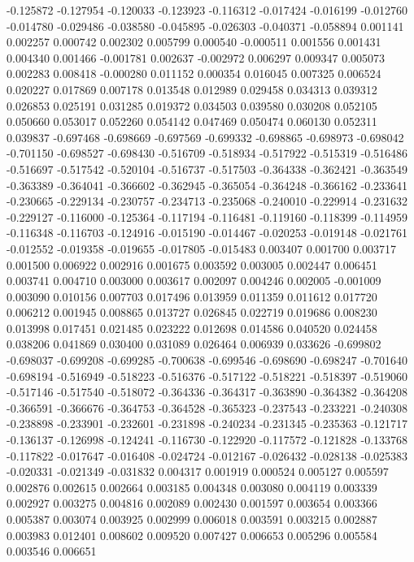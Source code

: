 -0.125872
-0.127954
-0.120033
-0.123923
-0.116312
-0.017424
-0.016199
-0.012760
-0.014780
-0.029486
-0.038580
-0.045895
-0.026303
-0.040371
-0.058894
0.001141
0.002257
0.000742
0.002302
0.005799
0.000540
-0.000511
0.001556
0.001431
0.004340
0.001466
-0.001781
0.002637
-0.002972
0.006297
0.009347
0.005073
0.002283
0.008418
-0.000280
0.011152
0.000354
0.016045
0.007325
0.006524
0.020227
0.017869
0.007178
0.013548
0.012989
0.029458
0.034313
0.039312
0.026853
0.025191
0.031285
0.019372
0.034503
0.039580
0.030208
0.052105
0.050660
0.053017
0.052260
0.054142
0.047469
0.050474
0.060130
0.052311
0.039837
-0.697468
-0.698669
-0.697569
-0.699332
-0.698865
-0.698973
-0.698042
-0.701150
-0.698527
-0.698430
-0.516709
-0.518934
-0.517922
-0.515319
-0.516486
-0.516697
-0.517542
-0.520104
-0.516737
-0.517503
-0.364338
-0.362421
-0.363549
-0.363389
-0.364041
-0.366602
-0.362945
-0.365054
-0.364248
-0.366162
-0.233641
-0.230665
-0.229134
-0.230757
-0.234713
-0.235068
-0.240010
-0.229914
-0.231632
-0.229127
-0.116000
-0.125364
-0.117194
-0.116481
-0.119160
-0.118399
-0.114959
-0.116348
-0.116703
-0.124916
-0.015190
-0.014467
-0.020253
-0.019148
-0.021761
-0.012552
-0.019358
-0.019655
-0.017805
-0.015483
0.003407
0.001700
0.003717
0.001500
0.006922
0.002916
0.001675
0.003592
0.003005
0.002447
0.006451
0.003741
0.004710
0.003000
0.003617
0.002097
0.004246
0.002005
-0.001009
0.003090
0.010156
0.007703
0.017496
0.013959
0.011359
0.011612
0.017720
0.006212
0.001945
0.008865
0.013727
0.026845
0.022719
0.019686
0.008230
0.013998
0.017451
0.021485
0.023222
0.012698
0.014586
0.040520
0.024458
0.038206
0.041869
0.030400
0.031089
0.026464
0.006939
0.033626
-0.699802
-0.698037
-0.699208
-0.699285
-0.700638
-0.699546
-0.698690
-0.698247
-0.701640
-0.698194
-0.516949
-0.518223
-0.516376
-0.517122
-0.518221
-0.518397
-0.519060
-0.517146
-0.517540
-0.518072
-0.364336
-0.364317
-0.363890
-0.364382
-0.364208
-0.366591
-0.366676
-0.364753
-0.364528
-0.365323
-0.237543
-0.233221
-0.240308
-0.238898
-0.233901
-0.232601
-0.231898
-0.240234
-0.231345
-0.235363
-0.121717
-0.136137
-0.126998
-0.124241
-0.116730
-0.122920
-0.117572
-0.121828
-0.133768
-0.117822
-0.017647
-0.016408
-0.024724
-0.012167
-0.026432
-0.028138
-0.025383
-0.020331
-0.021349
-0.031832
0.004317
0.001919
0.000524
0.005127
0.005597
0.002876
0.002615
0.002664
0.003185
0.004348
0.003080
0.004119
0.003339
0.002927
0.003275
0.004816
0.002089
0.002430
0.001597
0.003654
0.003366
0.005387
0.003074
0.003925
0.002999
0.006018
0.003591
0.003215
0.002887
0.003983
0.012401
0.008602
0.009520
0.007427
0.006653
0.005296
0.005584
0.003546
0.006651
